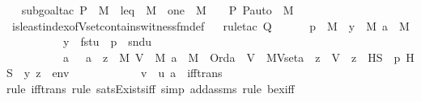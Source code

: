 \begin{isabellebody}
%
\isadelimproof
\isanewline
\ \ %
\endisadelimproof
%
\isatagproof
{}\isamarkupfalse%
{\isacharparenleft}{\kern0pt}subgoal{\isacharunderscore}{\kern0pt}tac\ {\isachardoublequoteopen}P\ {\isasymin}\ M\ {\isasymand}\ leq\ {\isasymin}\ M\ {\isasymand}\ one\ {\isasymin}\ M\ {\isasymand}\ {\isacharless}{\kern0pt}{\isasymF}{\isacharcomma}{\kern0pt}\ {\isasymG}{\isacharcomma}{\kern0pt}\ P{\isacharcomma}{\kern0pt}\ P{\isacharunderscore}{\kern0pt}auto{\isachargreater}{\kern0pt}\ {\isasymin}\ M{\isachardoublequoteclose}{\isacharparenright}{\kern0pt}\isanewline
\ \ \isamarkupfalse%
\ is{\isacharunderscore}{\kern0pt}least{\isacharunderscore}{\kern0pt}index{\isacharunderscore}{\kern0pt}of{\isacharunderscore}{\kern0pt}Vset{\isacharunderscore}{\kern0pt}contains{\isacharunderscore}{\kern0pt}witness{\isacharunderscore}{\kern0pt}fm{\isacharunderscore}{\kern0pt}def\isanewline
\ \ \isamarkupfalse%
{\isacharparenleft}{\kern0pt}rule{\isacharunderscore}{\kern0pt}tac\ Q{\isacharequal}{\kern0pt}\isanewline
\ \ \ \ \ \ {\isachardoublequoteopen}{\isasymexists}p\ {\isasymin}\ M{\isachardot}{\kern0pt}\ \ {\isasymexists}y\ {\isasymin}\ M{\isachardot}{\kern0pt}\ {\isasymexists}a\ {\isasymin}\ M{\isachardot}{\kern0pt}\isanewline
\ \ \ \ \ \ \ \ \ \ y\ {\isacharequal}{\kern0pt}\ fst{\isacharparenleft}{\kern0pt}u{\isacharparenright}{\kern0pt}\ {\isasymand}\ p\ {\isacharequal}{\kern0pt}\ snd{\isacharparenleft}{\kern0pt}u{\isacharparenright}{\kern0pt}\ {\isasymand}\ \isanewline
\ \ \ \ \ \ \ \ \ \ a\ {\isacharequal}{\kern0pt}\ {\isacharparenleft}{\kern0pt}{\isasymmu}\ a\ {\isachardot}{\kern0pt}\ {\isasymexists}z\ {\isasymin}\ M{\isachardot}{\kern0pt}\ {\isasymexists}V\ {\isasymin}\ M{\isachardot}{\kern0pt}\ a\ {\isasymin}\ M\ {\isasymand}\ Ord{\isacharparenleft}{\kern0pt}a{\isacharparenright}{\kern0pt}\ {\isasymand}\ V\ {\isacharequal}{\kern0pt}\ MVset{\isacharparenleft}{\kern0pt}a{\isacharparenright}{\kern0pt}\ {\isasymand}\ z\ {\isasymin}\ V\ {\isasymand}\ z\ {\isasymin}\ HS\ {\isasymand}\ p\ {\isasymtturnstile}HS\ {\isasymphi}\ {\isacharbrackleft}{\kern0pt}y{\isacharcomma}{\kern0pt}\ z{\isacharbrackright}{\kern0pt}\ {\isacharat}{\kern0pt}\ env{\isacharparenright}{\kern0pt}\ {\isasymand}\ \isanewline
\ \ \ \ \ \ \ \ \ \ v\ {\isacharequal}{\kern0pt}\ {\isacharless}{\kern0pt}u{\isacharcomma}{\kern0pt}\ a{\isachargreater}{\kern0pt}{\isachardoublequoteclose}\ \ iff{\isacharunderscore}{\kern0pt}trans{\isacharparenright}{\kern0pt}\ \isanewline
\ \ \ \ \isamarkupfalse%
{\isacharparenleft}{\kern0pt}rule\ iff{\isacharunderscore}{\kern0pt}trans{\isacharcomma}{\kern0pt}\ rule\ sats{\isacharunderscore}{\kern0pt}Exists{\isacharunderscore}{\kern0pt}iff{\isacharcomma}{\kern0pt}\ simp\ add{\isacharcolon}{\kern0pt}assms{\isacharcomma}{\kern0pt}\ rule\ bex{\isacharunderscore}{\kern0pt}iff{\isacharparenright}{\kern0pt}{\isacharplus}{\kern0pt}\isanewline

\end{isabellebody}
